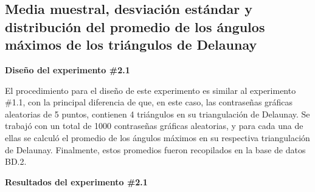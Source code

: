 \documentclass[12pt]{report}
\begin{document}
\subsection{Media muestral, desviación estándar y distribución del promedio de los ángulos máximos de los triángulos de Delaunay }
\label{sec:2.1}

\textbf{Diseño del experimento \#2.1}

El procedimiento para el diseño de este experimento es similar al experimento \#1.1, con la principal diferencia de que, en este caso, las contraseñas gráficas aleatorias de 5 puntos, contienen 4 triángulos en su triangulación de Delaunay. Se trabajó con un total de 1000 contraseñas gráficas aleatorias, y para cada una de ellas se calculó el promedio de los ángulos máximos en su respectiva triangulación de Delaunay. Finalmente, estos promedios fueron recopilados en la base de datos BD.2.



\textbf{Resultados del experimento \#2.1}
\end{document}
